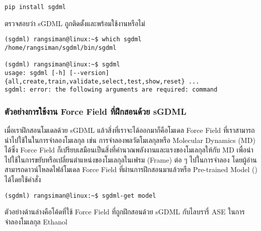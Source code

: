 \begin{lstlisting}[style=MyBash]
pip install sgdml
\end{lstlisting}

\vspace{1em}
\noindent ตรวจสอบว่า sGDML ถูกติดตั้งและพร้อมใช้งานหรือไม่

\begin{lstlisting}[style=MyBash]
(sgdml) rangsiman@linux:~$ which sgdml
/home/rangsiman/sgdml/bin/sgdml

(sgdml) rangsiman@linux:~$ sgdml
usage: sgdml [-h] [--version] {all,create,train,validate,select,test,show,reset} ...
sgdml: error: the following arguments are required: command
\end{lstlisting}

\subsubsection{ตัวอย่างการใช้งาน Force Field ที่ฝึกสอนด้วย sGDML}

เมื่อเราฝึกสอนโมเดลด้วย sGDML แล้วสิ่งที่เราจะได้ออกมาก็คือโมเดล Force Field ที่เราสามารถนำไปใช้ในในการจำลองโมเลกุล เช่น การจำลองพลวัตโมเลกุลหรือ Molecular Dynamics (MD) ได้ซึ่ง Force Field ก็เปรียบเสมือนเป็นสิ่งที่คำนวณพลังงานและแรงของโมเลกุลให้กับ MD เพื่อนำไปใช้ในการขยับหรือเปลี่ยนตำแหน่งของโมเลกุลในเฟรม (Frame) ต่อ ๆ ไปในการจำลอง  โดยผู้อ่านสามารถดาวน์โหลดไฟล์โมเดล Force Field ที่ผ่านการฝึกสอนมาแล้วหรือ Pre-trained Model () ได้โดยใช้คำสั่ง

\begin{lstlisting}[style=MyBash]
(sgdml) rangsiman@linux:~$ sgdml-get model
\end{lstlisting}

\noindent ตัวอย่างด้านล่างคือโค้ดที่ใช้ Force Field ที่ถูกฝึกสอนด้วย sGDML กับไลบรารี่ ASE ในการจำลองโมเลกุล Ethanol

